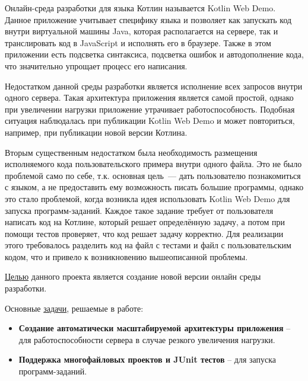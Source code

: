 	Онлайн-среда разработки для языка Котлин \cite{project_kotlin} называется Kotlin Web Demo. Данное приложение учитывает специфику  языка и позволяет как запускать код внутри виртуальной машины Java, которая располагается на сервере, так и транслировать код в JavaScript и исполнять его в браузере. Также в этом приложении есть подсветка синтаксиса, подсветка ошибок и автодополнение кода, что значительно упрощает процесс его написания.
	
	Недостатком данной среды разработки является исполнение всех запросов внутри одного сервера. Такая архитектура приложения является самой простой, однако при увеличении нагрузки приложение утрачивает работоспособность. Подобная ситуация наблюдалась при публикации Kotlin Web Demo и может повториться, например, при публикации новой версии Котлина.
	
	
	Вторым существенным недостатком была необходимость размещения  исполняемого кода  пользовательского примера внутри одного файла. Это не было проблемой само по себе, т.к. основная цель~--- дать пользователю познакомиться с языком, а не предоставить ему возможность писать большие программы, однако это стало проблемой, когда возникла идея использовать Kotlin Web Demo для запуска программ-заданий. Каждое такое задание требует от пользователя написать код на Котлине, который решает определённую задачу, а потом при помощи тестов проверяет, что код решает задачу корректно. Для реализации этого требовалось разделить код на файл с тестами и файл с пользовательским кодом, что и привело к возникновению вышеописанной проблемы.
	
	
	\underline{Целью} данного проекта является создание новой версии онлайн среды разработки.
	
	Основные \underline{задачи}, решаемые в работе:
	\begin{itemize}
		\item { \bf Создание автоматически масштабируемой архитектуры приложения} -- для работоспособности сервера в случае резкого увеличения нагрузки.
		\item { \bf Поддержка многофайловых проектов и JUnit тестов} -- для запуска программ-заданий.
	\end{itemize}
		


